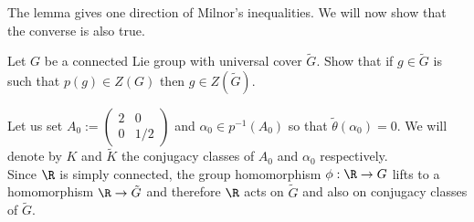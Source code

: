 The lemma gives one direction of Milnor's inequalities. We will now show that the converse is also true.

\begin{exercise}\label{center}
	Let $G$ be a connected Lie group with universal cover $\tilde{G}$. Show that if $g \in \tilde{G}$ is such that $p(g) \in Z(G)$ then $g \in Z(\tilde{G})$.
\end{exercise}





Let us set $A_{0}:= \left( \begin{array}{cl} 
2 & 0 \\
0 & 1/2
\end{array} \right)  $                    and   $\alpha_{0} \in p^{-1}(A_{0})$ so that $\tilde{\theta}(\alpha_{0})=0$.
We will denote by $K$ and $\tilde{K}$ the conjugacy classes of $A_{0}$ and $\alpha_{0}$ respectively. \\

Since $\R$ is simply connected, the group homomorphism $\phi: \R \rightarrow G$ lifts to a homomorphism $\R \rightarrow \tilde{G}$ and therefore
$\R$ acts on $\tilde{G}$ and also on conjugacy classes of $\tilde{G}$.





